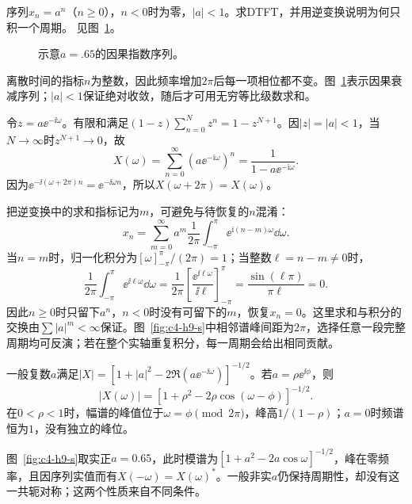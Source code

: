 \begin{exercise}[指数序列的周期频谱]\label{ex:c4-h9}
序列$x_n=a^n$（$n\ge0$），$n<0$时为零，$|a|<1$。求DTFT，并用逆变换说明为何只积一个周期。 见图~\ref{fig:c4-h9-q}。
\end{exercise}

\begin{figure}[H]\centering
{}
\caption{示意$a=.65$的因果指数序列。}\label{fig:c4-h9-q}
\end{figure}
\begin{solution}
离散时间的指标$n$为整数，因此频率增加$2\pi$后每一项相位都不变。图~\ref{fig:c4-h9-q}表示因果衰减序列；$|a|<1$保证绝对收敛，随后才可用无穷等比级数求和。


令$z=a\ee^{-\ii\omega}$。有限和满足$(1-z)\sum_{n=0}^Nz^n=1-z^{N+1}$。因$|z|=|a|<1$，当$N\to\infty$时$z^{N+1}\to0$，故
\[\boxed{X(\omega)=\sum_{n=0}^\infty(a\ee^{-\mathrm i\omega})^n=\frac1{1-a\ee^{-\mathrm i\omega}}}.
\]
因为$\ee^{-\ii(\omega+2\pi)n}=\ee^{-\ii\omega n}$，所以$X(\omega+2\pi)=X(\omega)$。


把逆变换中的求和指标记为$m$，可避免与待恢复的$n$混淆：
\[x_n=\sum_{m=0}^\infty a^m\frac1{2\pi}
\int_{-\pi}^{\pi}\ee^{\mathrm i(n-m)\omega}\dd\omega.\]
当$n=m$时，归一化积分为$[\omega]_{-\pi}^\pi/(2\pi)=1$；当整数$\ell=n-m\ne0$时，
\[\frac1{2\pi}\int_{-\pi}^{\pi}\ee^{\ii\ell\omega}\dd\omega
=\frac1{2\pi}\left[\frac{\ee^{\ii\ell\omega}}{\ii\ell}\right]_{-\pi}^\pi
=\frac{\sin(\ell\pi)}{\pi\ell}=0.\]
因此$n\ge0$时只留下$a^n$，$n<0$时没有可留下的$m$，恢复$x_n=0$。这里求和与积分的交换由$\sum|a|^m<\infty$保证。图~\ref{fig:c4-h9-s}中相邻谱峰间距为$2\pi$，选择任意一段完整周期均可反演；若在整个实轴重复积分，每一周期会给出相同贡献。

一般复数$a$满足$|X|=[1+|a|^2-2\Re(a\ee^{-\ii\omega})]^{-1/2}$。若$a=\rho\ee^{\ii\phi}$，则
\[|X(\omega)|=[1+\rho^2-2\rho\cos(\omega-\phi)]^{-1/2}.\]
在$0<\rho<1$时，幅谱的峰值位于$\omega=\phi\pmod{2\pi}$，峰高$1/(1-\rho)$；$a=0$时频谱恒为$1$，没有独立的峰位。

图~\ref{fig:c4-h9-s}取实正$a=0.65$，此时模谱为$[1+a^2-2a\cos\omega]^{-1/2}$，峰在零频率，且因序列实值而有$X(-\omega)=X(\omega)^*$。一般非实$a$仍保持周期性，却没有这一共轭对称；这两个性质来自不同条件。


\end{solution}
